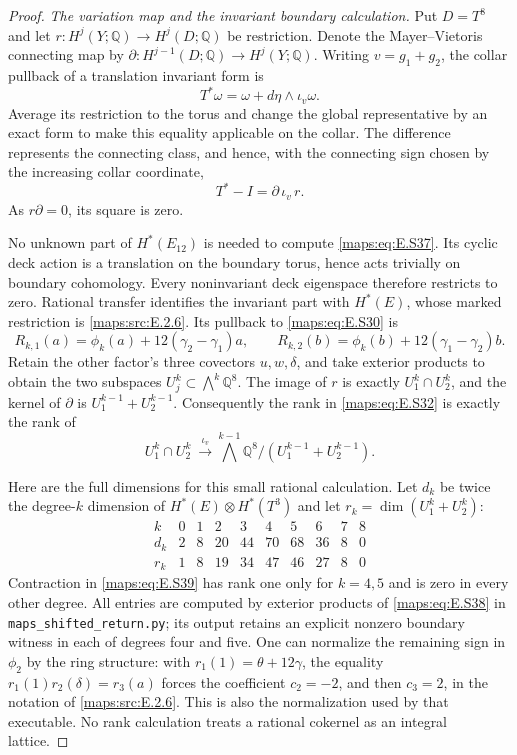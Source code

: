\begin{proof}
\emph{The variation map and the invariant boundary calculation.}
Put $D=T^8$ and let $r:H^j(Y;\mathbb Q)\to H^j(D;\mathbb Q)$
be restriction. Denote the Mayer--Vietoris connecting map
by $\partial:H^{j-1}(D;\mathbb Q)\to H^j(Y;\mathbb Q)$.
Writing $v=g_1+g_2$, the collar pullback of a translation
invariant form is
\[
       T^*\omega=\omega+d\eta\wedge\iota_v\omega.
\]
Average its restriction to the torus and change the global
representative by an exact form to make this equality
applicable on the collar. The difference represents the
connecting class, and hence, with the connecting sign
chosen by the increasing collar coordinate,
\[
                          T^*-I=\partial\,\iota_v\,r.
 \tag{E.S37}\label{maps:eq:E.S37}
\]
As $r\partial=0$, its square is zero.

No unknown part of $H^*(E_{12})$ is needed to compute
\eqref{maps:eq:E.S37}. Its cyclic deck action is a translation on the
boundary torus, hence acts trivially on boundary cohomology.
Every noninvariant deck eigenspace therefore restricts to
zero. Rational transfer identifies the invariant part
with $H^*(E)$, whose marked restriction is \ref{maps:src:E.2.6}. Its
pullback to \eqref{maps:eq:E.S30} is
\[
 R_{k,1}(a)=\phi_k(a)+12(\gamma_2-\gamma_1)a,
 \qquad
 R_{k,2}(b)=\phi_k(b)+12(\gamma_1-\gamma_2)b.
 \tag{E.S38}\label{maps:eq:E.S38}
\]
Retain the other factor's three covectors $u,w,\delta$,
and take exterior products to obtain the two subspaces
$U_j^k\subset\bigwedge^k\mathbb Q^8$.
The image of $r$ is exactly $U_1^k\cap U_2^k$, and the
kernel of $\partial$ is $U_1^{k-1}+U_2^{k-1}$.
Consequently the rank in \eqref{maps:eq:E.S32} is exactly the rank of
\[
 U_1^k\cap U_2^k\ \stackrel{\iota_v}{\longrightarrow}
 \bigwedge^{k-1}\mathbb Q^8/(U_1^{k-1}+U_2^{k-1}).
 \tag{E.S39}\label{maps:eq:E.S39}
\]

Here are the full dimensions for this small rational
calculation. Let $d_k$ be twice the degree-$k$ dimension
of $H^*(E)\otimes H^*(T^3)$ and let
$r_k=\dim(U_1^k+U_2^k)$:
\[
 \begin{array}{c|rrrrrrrrr}
 k&0&1&2&3&4&5&6&7&8\\ \hline
 d_k&2&8&20&44&70&68&36&8&0\\
 r_k&1&8&19&34&47&46&27&8&0
 \end{array}
 \tag{E.S40}\label{maps:eq:E.S40}
\]
Contraction in \eqref{maps:eq:E.S39} has rank one only for
$k=4,5$ and is zero in every other degree. All entries
are computed by exterior products of \eqref{maps:eq:E.S38} in
\texttt{maps\_shifted\_return.py}; its output retains an
explicit nonzero boundary witness in each of degrees
four and five. One can normalize the remaining sign in
$\phi_2$ by the ring structure: with
$r_1(1)=\theta+12\gamma$, the equality
$r_1(1)r_2(\delta)=r_3(a)$ forces the coefficient
$c_2=-2$, and then $c_3=2$, in the notation of \ref{maps:src:E.2.6}.
This is also the normalization used by that executable.
No rank calculation treats a rational cokernel as an
integral lattice.


\end{proof}
